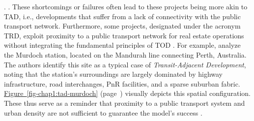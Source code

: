 \begin{refsegment}
{}. \textcolor{blue}{\autocites[358]{lund_reasons_2006}[3]{renne_transit-adjacent_2009}}. These shortcomings or failures often lead to these projects being more akin to \acrfull{TAD}, i.e., developments that suffer from a lack of connectivity with the public transport network. Furthermore, some projects, designated under the acronym \acrfull{TRD}, exploit proximity to a public transport network for real estate operations without integrating the fundamental principles of \acrshort{TOD} \textcolor{blue}{\autocite[18]{bentayou_transit-oriented_2015}}. For example, \textcolor{blue}{\textcite[18]{khan_parking_2009}} analyze the Murdoch station, located on the Mandurah line connecting Perth, Australia. The authors identify this site as a typical case of \textsl{Transit-Adjacent Development}, noting that the station's surroundings are largely dominated by highway infrastructure, road interchanges, \acrfull{PnR} facilities, and a sparse suburban fabric. \hyperref[fig-chap1:tad-murdoch]{Figure~\ref{fig-chap1:tad-murdoch}} (page~\pageref{fig-chap1:tad-murdoch}) visually depicts this spatial configuration. These  thus serve as a reminder that proximity to a public transport system and urban density are not sufficient to guarantee the model's success \textcolor{blue}{\autocite[18]{bentayou_transit-oriented_2015}}.%


\end{refsegment}
